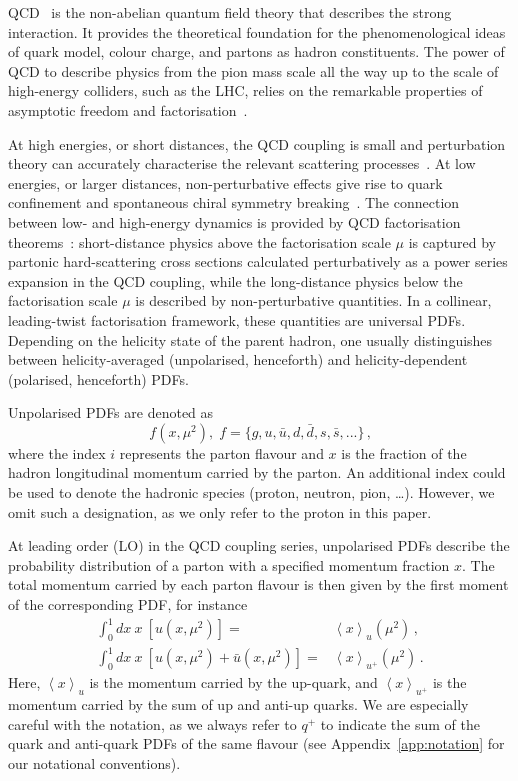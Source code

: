 QCD~\cite{Collins:2011zzd} is the non-abelian quantum field 
theory that describes the strong interaction.
%
It provides the theoretical foundation for the phenomenological ideas of 
quark model, colour charge, and partons as hadron constituents.
%
The power of QCD to describe physics from the pion mass scale all the way up 
to the scale of high-energy colliders, such as the LHC, relies on the 
remarkable properties of asymptotic freedom and 
factorisation~\cite{Gross:1973ju,Gross:1973id,Gross:1974cs,Politzer:1974fr}.

At high energies, or short distances, the QCD coupling is small 
and perturbation theory can accurately characterise the relevant scattering 
processes~\cite{Campbell:2006wx}.
%
At low energies, or larger distances, non-perturbative effects give rise to 
quark confinement and spontaneous chiral symmetry breaking~\cite{Gasser:1983yg}.
%
The connection between low- and high-energy dynamics is provided by QCD 
factorisation theorems~\cite{Collins:1989gx}: 
short-distance physics above the factorisation scale $\mu$ is captured by 
partonic hard-scattering cross sections calculated perturbatively as a 
power series expansion in the QCD coupling, while the 
long-distance physics below the factorisation scale $\mu$ is described by 
non-perturbative quantities.
%
In a collinear, leading-twist factorisation framework, these quantities are
universal PDFs.
%
Depending on the helicity state of the parent hadron, one usually 
distinguishes between helicity-averaged (unpolarised, henceforth)
and helicity-dependent (polarised, henceforth) PDFs.

Unpolarised PDFs are denoted as 
\begin{equation}
f(x,\mu^2)\mbox{,} \ \ f=\{g,u,\bar{u},d,\bar{d},s,\bar{s},...\}
\,\mbox{,}
\label{eq:unpPDFs}
\end{equation}
where the index $i$ represents the parton flavour and $x$ is the fraction
of the hadron longitudinal momentum carried by the parton.
%
An additional index could be used to denote the hadronic species (proton,
neutron, pion, \dots).
%
However, we omit such a designation, as we only refer to the proton
in this paper.

At leading order (LO) in the QCD coupling series, unpolarised PDFs 
describe the probability distribution of a parton with a specified 
momentum fraction $x$.
%
The total momentum carried by each parton flavour is then given by 
the first moment of the corresponding PDF, for instance
%
\begin{align}
\int_{0}^{1}dx\ x\ \left[u(x,\mu^2)\right] 
= & {}  
\left\langle x\right\rangle _{u}(\mu^2)\,, \label{eq:umoment1}\\
\int_{0}^{1}dx\ x\ \left[u(x,\mu^2)+\bar{u}(x,\mu^2)\right] 
= & {} 
\left\langle x\right\rangle _{u^{+}}(\mu^2)\,. \label{eq:uplusmoment1}
\end{align}
%
Here, $\left\langle x\right\rangle _{u}$ is the momentum
carried by the up-quark, and $\left\langle x\right\rangle _{u^{+}}$ is
the momentum carried by the sum of up and anti-up quarks.
%
We are especially careful with the notation, as we always refer to $q^+$ to 
indicate the sum of the quark and anti-quark PDFs of the same flavour (see
Appendix~\ref{app:notation} for our notational conventions).

